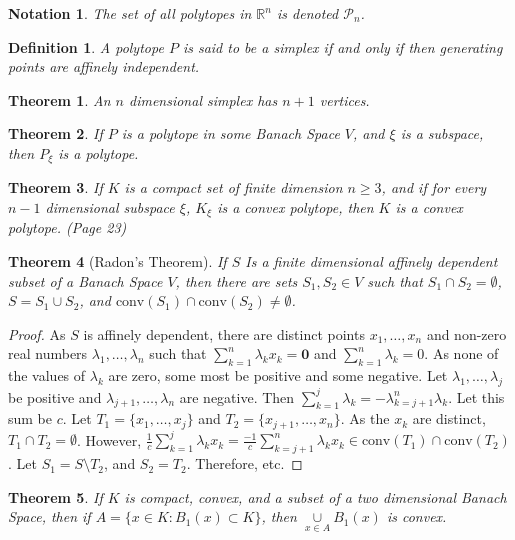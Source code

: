 \documentclass[oneside]{book}
\theoremstyle{mystyle}
\newtheorem{theorem}{Theorem}[section]
\newtheorem{definition}{Definition}[section]
\newtheorem{notation}{Notation}[section]
\begin{document}
\begin{notation}
The set of all polytopes in $\mathbb{R}^n$ is denoted $\mathscr{P}_n$.
\end{notation} 

\begin{definition}
A polytope $P$ is said to be a simplex if and only if then generating points are affinely independent.
\end{definition}

\begin{theorem}
An $n$ dimensional simplex has $n+1$ vertices.
\end{theorem}

\begin{theorem}
If $P$ is a polytope in some Banach Space $V$, and $\xi$ is a subspace, then $P_{\xi}$ is a polytope.
\end{theorem}

\begin{theorem}
If $K$ is a compact set of finite dimension $n\geq 3$, and if for every $n-1$ dimensional subspace $\xi$, $K_{\xi}$ is a convex polytope, then $K$ is a convex polytope. (Page 23)
\end{theorem}

\begin{theorem}[Radon's Theorem]
If $S$ Is a finite dimensional affinely dependent subset of a Banach Space $V$, then there are sets $S_1,S_2\in V$ such that $S_1\cap S_2 = \emptyset$, $S=S_1\cup S_2$, and $\textrm{conv}(S_1)\cap \textrm{conv}(S_2) \ne \emptyset$.
\end{theorem}
\begin{proof}
As $S$ is affinely dependent, there are distinct points $x_1,\hdots,x_n$ and non-zero real numbers $\lambda_1,\hdots,\lambda_n$ such that $\sum_{k=1}^{n}\lambda_k x_k= \mathbf{0}$ and $\sum_{k=1}^{n}\lambda_k = 0$. As none of the values of $\lambda_k$ are zero, some most be positive and some negative. Let $\lambda_1,\hdots, \lambda_j$ be positive and $\lambda_{j+1},\hdots, \lambda_n$ are negative. Then $\sum_{k=1}^{j} \lambda_k = - \lambda_{k=j+1}^{n}\lambda_k$. Let this sum be $c$. Let $T_1 = \{x_1,\hdots, x_j\}$ and $T_2=\{x_{j+1},\hdots, x_{n}\}$. As the $x_k$ are distinct, $T_1\cap T_2 = \emptyset$. However, $\frac{1}{c}\sum_{k=1}^{j}\lambda_k x_k = \frac{-1}{c}\sum_{k=j+1}^{n} \lambda_k x_k \in\textrm{conv}(T_1)\cap \textrm{conv}(T_2)$. Let $S_1 = S\setminus T_2$, and $S_2 = T_2$. Therefore, etc.
\end{proof}

\begin{theorem}
If $K$ is compact, convex, and a subset of a two dimensional Banach Space, then if $A = \{x\in K:B_{1}(x)\subset K\}$, then $\underset{x\in A}\cup B_{1}(x)$ is convex.
\end{theorem}
\end{document}
